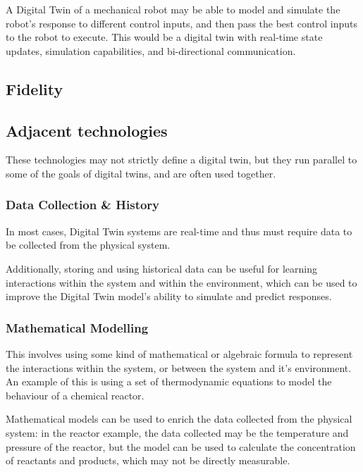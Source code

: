 A Digital Twin of a mechanical robot may be able to model and simulate the robot's response to different control inputs, and then pass the best control inputs to the robot to execute. This would be a digital twin with real-time state updates, simulation capabilities, and bi-directional communication.


\subsection{Fidelity}



\subsection{Adjacent technologies}

These technologies may not strictly define a digital twin, but they run parallel to some of the goals of digital twins, and are often used together.

\subsubsection{Data Collection \& History}

In most cases, Digital Twin systems are real-time and thus must require data to be collected from the physical system.


Additionally, storing and using historical data can be useful for learning interactions within the system and within the environment, which can be used to improve the Digital Twin model's ability to simulate and predict responses. 

\subsubsection{Mathematical Modelling}

This involves using some kind of mathematical or algebraic formula to represent the interactions within the system, or between the system and it's environment. An example of this is using a set of thermodynamic equations to model the behaviour of a chemical reactor. 

Mathematical models can be used to enrich the data collected from the physical system: in the reactor example, the data collected may be the temperature and pressure of the reactor, but the model can be used to calculate the concentration of reactants and products, which may not be directly measurable.

